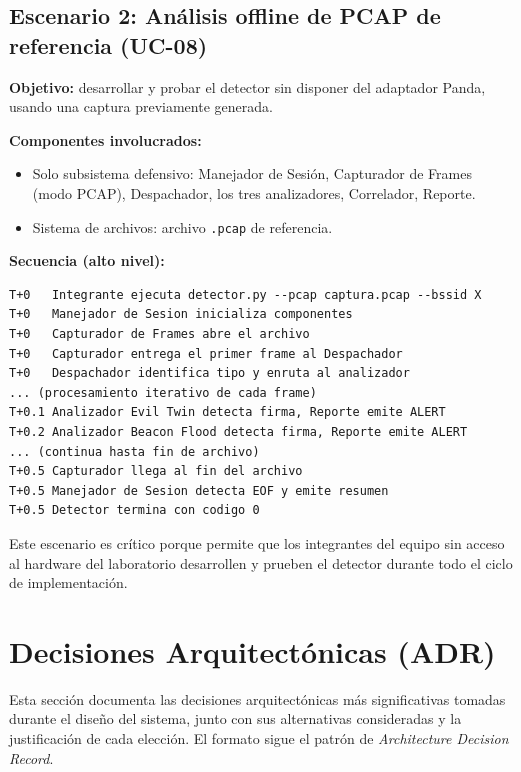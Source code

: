 \documentclass[11pt,a4paper]{article}
\begin{document}
\subsection{Escenario 2: Análisis offline de PCAP de referencia (UC-08)}

\textbf{Objetivo:} desarrollar y probar el detector sin disponer del
adaptador Panda, usando una captura previamente generada.

\textbf{Componentes involucrados:}

\begin{itemize}
  \item Solo subsistema defensivo: Manejador de Sesión, Capturador de
    Frames (modo PCAP), Despachador, los tres analizadores, Correlador,
    Reporte.
  \item Sistema de archivos: archivo \texttt{.pcap} de referencia.
\end{itemize}

\textbf{Secuencia (alto nivel):}

\vspace{0.3cm}
\begin{verbatim}
T+0   Integrante ejecuta detector.py --pcap captura.pcap --bssid X
T+0   Manejador de Sesion inicializa componentes
T+0   Capturador de Frames abre el archivo
T+0   Capturador entrega el primer frame al Despachador
T+0   Despachador identifica tipo y enruta al analizador
... (procesamiento iterativo de cada frame)
T+0.1 Analizador Evil Twin detecta firma, Reporte emite ALERT
T+0.2 Analizador Beacon Flood detecta firma, Reporte emite ALERT
... (continua hasta fin de archivo)
T+0.5 Capturador llega al fin del archivo
T+0.5 Manejador de Sesion detecta EOF y emite resumen
T+0.5 Detector termina con codigo 0
\end{verbatim}

Este escenario es crítico porque permite que los integrantes del equipo
sin acceso al hardware del laboratorio desarrollen y prueben el detector
durante todo el ciclo de implementación.

\section{Decisiones Arquitectónicas (ADR)}

Esta sección documenta las decisiones arquitectónicas más significativas
tomadas durante el diseño del sistema, junto con sus alternativas
consideradas y la justificación de cada elección. El formato sigue el
patrón de \emph{Architecture Decision Record}.
\end{document}
